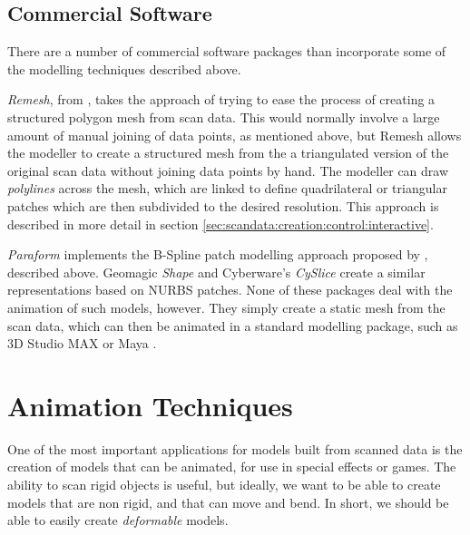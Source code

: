 \subsection{\label{sec:litreview:modeling:software}Commercial Software}

There are a number of commercial software packages than incorporate some of the modelling techniques described above. 

{\it Remesh}, from \citet{3DScanners}, takes the approach of trying to ease the process of creating a structured polygon mesh from scan data. This would normally involve a large amount of manual joining of data points, as mentioned above, but Remesh allows the modeller to create a structured mesh from the a triangulated version of the original scan data without joining data points by hand. The modeller can draw {\it polylines} across the mesh, which are linked to define quadrilateral or triangular patches which are then subdivided to the desired resolution. This approach is described in more detail in section \ref{sec:scandata:creation:control:interactive}.

{\it Paraform} \cite{Paraform} implements the B-Spline patch modelling approach proposed by \citet{Krishnamurthy96}, described above. Geomagic {\it Shape} \cite{Geomagic} and Cyberware's {\it CySlice} \cite{Cyberware} create a similar representations based on NURBS patches. None of these packages deal with the animation of such models, however. They simply create a static mesh from the scan data, which can then be animated in a standard modelling package, such as 3D Studio MAX \cite{3DSMAX} or Maya \cite{Maya}.

\section{\label{sec:litreview:animation}Animation Techniques}
One of the most important applications for models built from scanned data  is the creation of models that can be animated, for use in special effects or games. The ability to scan rigid objects is useful, but ideally, we want to be able to create models that are non rigid, and that can move and bend. In short, we should be able to easily create {\it deformable} models.


